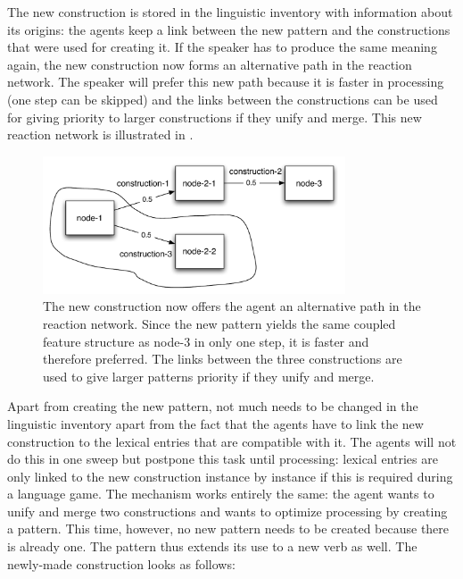 The new construction is stored in the linguistic inventory with information about its origins: the agents keep a link between the new pattern and the constructions that were used for creating it. If the speaker has to produce the same meaning again, the new construction now forms an alternative path in the reaction network. The speaker will prefer this new path because it is faster in processing (one step can be skipped) and the links between the constructions can be used for giving priority to larger constructions if they unify and merge. This new reaction network is illustrated in .
\begin{figure}[h]
\centerline{\includegraphics[width=0.8\textwidth]{Chapter4/figs/reaction2}}
  \caption[A reaction network with the new pattern]{The new construction now offers the agent an alternative path in the reaction network. Since the new pattern yields the same coupled feature structure as node-3 in only one step, it is faster and therefore preferred. The links between the three constructions are used to give larger patterns priority if they unify and merge.}
   \label{f:reaction2}
\end{figure}

Apart from creating the new pattern, not much needs to be changed in the linguistic inventory apart from the fact that the agents have to link the new construction to the lexical entries that are compatible with it. The agents will not do this in one sweep but postpone this task until processing: lexical entries are only linked to the new construction instance by instance if this is required during a language game. The mechanism works entirely the same: the agent wants to unify and merge two constructions and wants to optimize processing by creating a pattern. This time, however, no new pattern needs to be created because there is already one. The pattern thus extends its use to a new verb as well. The newly-made construction looks as follows:

